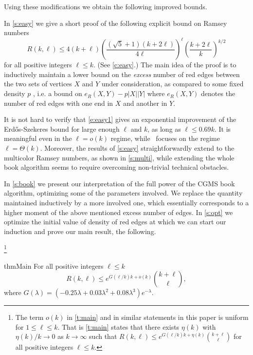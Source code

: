 \documentclass[reqno,final,12pt]{amsart}
\newcommand{\fs}[2]{\left(\frac{#1}{#2}\right)}
\newcommand{\s}[1]{\left(#1\right)}
\begin{document}
Using these modifications we obtain the following improved bounds. 

\vskip 5pt

In \cref{s:easy} we give a short proof of the following explicit bound on
Ramsey numbers
\begin{equation}\label{e:easy1}R(k,\ell) \leq  4(k+\ell)\fs{\left(\sqrt{5}+1\right) (k+2 \ell)}{4 \ell}^\ell \fs{k + 2\ell}{k}^{k/2}\end{equation}
for all positive integers $\ell \leq k$. (See \cref{c:easy}.)
The main idea of the proof is to inductively maintain a lower bound on the \emph{excess} number of red edges between the two sets of vertices $X$ and $Y$ under consideration, as compared to some fixed density $p$ , i.e. a bound on  $e_R(X,Y)-p|X||Y|$ where $e_R(X,Y)$ denotes the number of red edges with one end in $X$ and another in $Y$.

It is not hard to verify that \eqref{e:easy1} gives an exponential improvement of the Erd\H{o}s-Szekeres bound for large enough $\ell$ and $k$, as long as $\ell \leq 0.69k$. It is meaningful even in the $\ell=o(k)$ regime, while~\cite{CGMS23} focuses on the regime $\ell=\Theta(k)$. Moreover, the results of \cref{s:easy} straightforwardly extend to the multicolor Ramsey numbers, as shown in \cref{s:multi}, while extending the whole book algorithm seems to require overcoming non-trivial technical obstacles.

\vskip 5pt
In \cref{s:book} we present our interpretation of the full power of the CGMS book algorithm, optimizing some of the parameters involved. We replace the quantity maintained inductively by a more involved one, which  essentially corresponds to a higher moment of the above mentioned excess number of edges. In \cref{s:opt} we optimize the initial value of density of red edges at which we can start our induction and prove our main result, the following. 

\footnote{The term $o(k)$ in \cref{t:main} and in similar statements in this paper is uniform for  $1 \leq \ell \leq k$. That is \cref{t:main} states that there exists $\eta(k)$ with $\eta(k)/k \to 0$ as $k \to \infty$ such that $ R(k,\ell) \leq e^{G(\ell/k)k+
	\eta(k)}\binom{k+\ell}{\ell}  $ for all positive integers $\ell \leq k$.}

\begin{restatable}{thm}{Main}\label{t:main} 
	For all positive integers $\ell \leq k$	$$ R(k,\ell) \leq e^{G(\ell/k)k+o(k)}\binom{k+\ell}{\ell},  $$
	where $G(\lambda)= \s{-0.25\lambda + 0.03 \lambda^2 + 0.08\lambda^3}e^{-\lambda}.$
\end{restatable}
\end{document}
